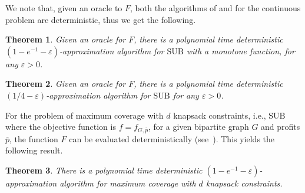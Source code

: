 \documentclass[11pt]{article}
\newtheorem{theorem}{Theorem}[section]
\newcommand{\eps}{\varepsilon}
\newcommand{\SUB}{\mbox{SUB}}
\begin{document}
We note that,
given an oracle to $F$, both the algorithms of \cite{Vo08} and \cite{LMNS09} for the
continuous problem are deterministic, thus we get
the following.

\begin{theorem}
\label{thm:det_alg}
Given an oracle for $F$,
there is a polynomial time deterministic  $(1-e^{-1} - \eps)$-approximation
algorithm for $\SUB$ with a monotone function, for any $\eps>0$.
\end{theorem}

\begin{theorem}
\label{thm:det_alg_non_monotone}
Given an oracle for $F$,
there is a polynomial time deterministic  $(1/4- \eps)$-approximation
algorithm for $\SUB$ for any $\eps>0$.
\end{theorem}

For the problem of maximum coverage with $d$ knapsack
constraints, i.e.,  $\SUB$ where the objective function is
$f=f_{G,\bar{p}}$, for a given bipartite graph $G$ and profits
$\bar{p}$, the function $F$ can be evaluated deterministically
(see~\cite{as04}). This yields the following result.

\begin{theorem}
There is a polynomial time deterministic
$(1-e^{-1}-\eps)$-approximation algorithm for maximum coverage with
$d$ knapsack constraints.
\end{theorem}
\end{document}
